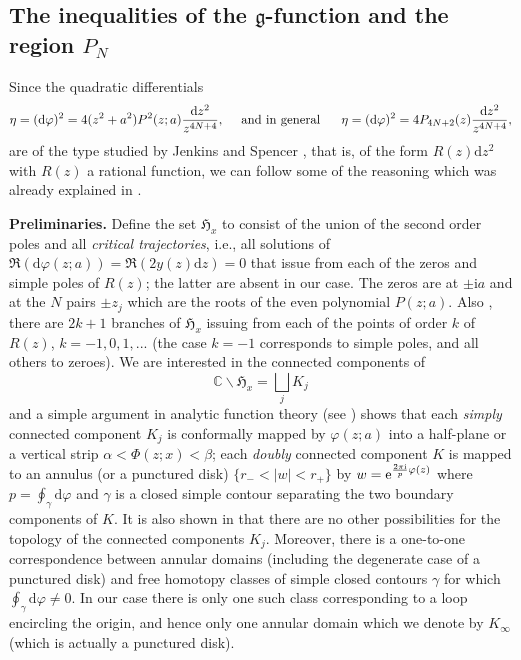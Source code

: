 \documentclass[10pt,reqno,oneside]{amsart}
\def \gg{{\mathfrak g}}
\renewcommand{\d}{{\mathrm d}}
\newcommand{\im}{\mathrm{i}}
\numberwithin{equation}{section}
\def\C{{\mathbb C}}
\begin{document}
\subsection{The inequalities of the $\gg$-function and the region $P_N$}\label{gfunctdelta} Since the quadratic differentials
\begin{equation}
\label{etag}
	\eta=(\d\varphi)^2=4(z^2+a^2)P^2(z;a)\frac{\d z^2}{z^{4N+4}},\ \ \ \ \textnormal{and in general}\ \ \ \ \ \eta=(\d\varphi)^2=4P_{4N+2}(z)\frac{\d z^2}{z^{4N+4}},
\end{equation}
are of the type studied by Jenkins and Spencer \cite{JS}, that is, of the form $R(z) \d z^2$ with $R(z)$ a rational function, we can follow some of the reasoning which was  already explained in \cite{BB}.\smallskip

{\bf Preliminaries.}  Define the set  $\mathfrak H_x$ to consist of the union of the second order poles and all  {\it critical  trajectories}, i.e.,   all solutions of $\Re(\d \varphi(z;a))= \Re(2y(z) \d z)=0$ that issue from each of the zeros and simple poles of $R(z)$; the latter are absent in our case. The zeros are at $\pm\im a$ and at the $N$ pairs $\pm z_{j}$ which are the roots of the even polynomial  $P(z;a)$. Also \cite{S}, there are 
 {\em $2k+1$} branches of $\mathfrak H_x$  issuing from each of the points of order $k$ of $R(z)$, $k=-1,0,1,...$ (the case $k=-1$ corresponds to simple poles, and all others to zeroes). We are interested in the connected components of
 \begin{equation*}
 	\C\backslash\mathfrak H_x=\bigsqcup_jK_j
\end{equation*}
and a simple argument in analytic function theory (see  \cite{JS}) shows that each {\em simply} connected component $K_j$ is conformally mapped by $\varphi(z;a)$ into a half-plane or a vertical strip $\alpha<\Phi(z;x)<\beta$; each {\em doubly} connected component $K$ is mapped to an annulus (or a punctured disk) $\{
r_-<|w|<r_+\}$ by $w = {\rm e}^{\frac{2\pi\im} {p} \varphi(z)}$ where $p= \oint_\gamma \d \varphi$  and $\gamma$ is a closed simple contour separating the two boundary components of $K$. It is also shown in \cite{JS} that there are no other possibilities for the topology of the connected components $K_j$. Moreover, there is a one-to-one correspondence between annular domains (including the degenerate case of a punctured disk) and  free homotopy classes of simple closed contours $\gamma$ for which $\oint_\gamma \d \varphi \neq 0$. In our case there is only one such class corresponding to a loop encircling the origin, and hence only one annular domain which we denote by $K_\infty$ (which is actually a punctured disk).\smallskip
\end{document}
